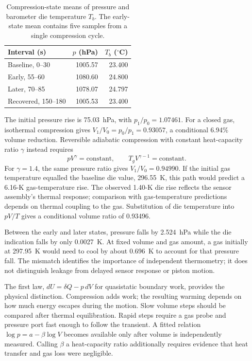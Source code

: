 \begin{table}[t]
\caption{Compression-state means of pressure and barometer die temperature $T_b$. The early-state mean contains five samples from a single compression cycle.}
\label{tab:mission-to-mars-compression}
\centering\small
\begin{tabular}{@{}lrr@{}}
\toprule
Interval (s) & $p$ (hPa) & $T_b$ (${}^\circ$C)\\
\midrule
Baseline, 0--30 & 1005.57 & 23.400\\
Early, 55--60 & 1080.60 & 24.800\\
Later, 70--85 & 1078.07 & 24.797\\
Recovered, 150--180 & 1005.53 & 23.400\\
\bottomrule
\end{tabular}
\end{table}

The initial pressure rise is 75.03~hPa, with $p_1/p_0=1.07461$. For a closed gas, isothermal compression gives $V_1/V_0=p_0/p_1=0.93057$, a conditional 6.94\% volume reduction. Reversible adiabatic compression with constant heat-capacity ratio $\gamma$ instead requires
\begin{equation}
 pV^\gamma=\mathrm{constant},\qquad
 T_gV^{\gamma-1}=\mathrm{constant}.
 \label{eq:mission-to-mars-adiabatic}
\end{equation}
For $\gamma=1.4$, the same pressure ratio gives $V_1/V_0=0.94990$. If the initial gas temperature equalled the baseline die value, 296.55~K, this path would predict a 6.16-K gas-temperature rise. The observed 1.40-K die rise reflects the sensor assembly's thermal response; comparison with gas-temperature predictions depends on thermal coupling to the gas. Substitution of die temperature into $pV/T$ gives a conditional volume ratio of 0.93496.

Between the early and later states, pressure falls by 2.524~hPa while the die indication falls by only 0.0027~K. At fixed volume and gas amount, a gas initially at 297.95~K would need to cool by about 0.696~K to account for that pressure fall. The mismatch identifies the importance of independent thermometry; it does not distinguish leakage from delayed sensor response or piston motion.

The first law, $dU=\delta Q-p\,dV$ for quasistatic boundary work, provides the physical distinction. Compression adds work; the resulting warming depends on how much energy escapes during the motion. Slow volume steps should be compared after thermal equilibration. Rapid steps require a gas probe and pressure port fast enough to follow the transient. A fitted relation $\log p=a-\beta\log V$ becomes available only after volume is independently measured. Calling $\beta$ a heat-capacity ratio additionally requires evidence that heat transfer and gas loss were negligible.

